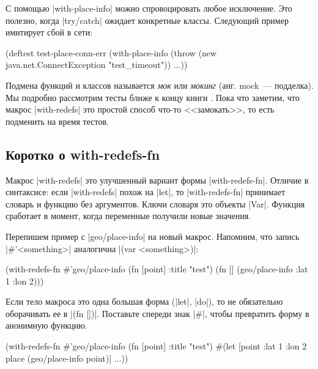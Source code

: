 С помощью \spverb|with-place-info| можно спровоцировать любое исключение. Это
полезно, когда \spverb|try/catch| ожидает конкретные классы. Следующий пример
имитирует сбой в сети:

\begin{english}
  \begin{clojure}
(deftest test-place-conn-err
  (with-place-info
    (throw (new java.net.ConnectException "test_timeout"))
    ...))
  \end{clojure}
\end{english}

Подмена функций и классов называется \emph{мок} или \emph{мокинг} (анг. mock~---
подделка). Мы подробно рассмотрим тесты ближе к концу
книги . Пока что заметим, что макрос \spverb|with-redefs|
это простой способ что-то <<замокать>>, то есть подменить на время тестов.

\subsection{Коротко о with-redefs-fn}

Макрос \spverb|with-redefs| это улучшенный вариант формы
\spverb|with-redefs-fn|. Отличие в синтаксисе: если \spverb|with-redefs| похож
на \spverb|let|, то \spverb|with-redefs-fn| принимает словарь и функцию без
аргументов. Ключи словаря это объекты \spverb|Var|. Функция сработает в момент,
когда переменные получили новые значения.

Перепишем пример с \spverb|geo/place-info| на новый макрос. Напомним, что запись
\spverb|#'<something>| аналогична \spverb|(var <something>)|:

\begin{english}
  \begin{clojure}
(with-redefs-fn
  {#'geo/place-info (fn [point] {:title "test"})}
  (fn []
    (geo/place-info {:lat 1 :lon 2})))
  \end{clojure}
\end{english}

Если тело макроса это одна большая форма (\spverb|let|, \spverb|do|), то не
обязательно оборачивать ее в \spverb|(fn [])|. Поставьте спереди знак
\spverb|#|, чтобы превратить форму в анонимную функцию.

\begin{english}
  \begin{clojure}
(with-redefs-fn
  {#'geo/place-info (fn [point] {:title "test"})}
  #(let [point {:lat 1 :lon 2}
         place (geo/place-info point)]
     ...))
  \end{clojure}
\end{english}

